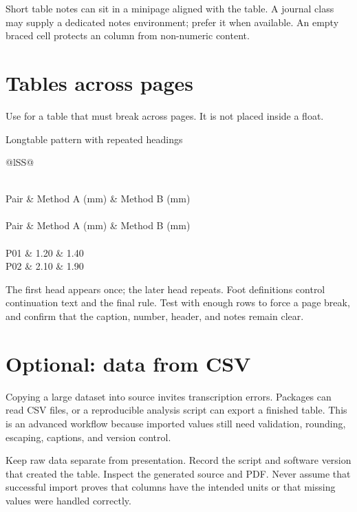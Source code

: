 Short table notes can sit in a minipage aligned with the table. A journal class
may supply a dedicated notes environment; prefer it when available. An empty
braced cell protects an  column from non-numeric content.

\section{Tables across pages}

Use  for a table that must break across pages. It is not placed
inside a  float.

\begin{latexcode}{Longtable pattern with repeated headings}
\begin{longtable}{@{}lSS@{}}
\caption{Complete simulated measurements.}\label{tab:all-pairs}\\
\toprule
{Pair} & {Method A (mm)} & {Method B (mm)} \\
\midrule
\endfirsthead
{}\\
\toprule
{Pair} & {Method A (mm)} & {Method B (mm)} \\
\midrule
\endhead
\midrule
{}\\
\endfoot
\bottomrule
\endlastfoot
P01 & 1.20 & 1.40 \\
P02 & 2.10 & 1.90 \\
\end{longtable}
\end{latexcode}

The first head appears once; the later head repeats. Foot definitions control
continuation text and the final rule. Test with enough rows to force a page
break, and confirm that the caption, number, header, and notes remain clear.

\section{Optional: data from CSV}

Copying a large dataset into source invites transcription errors. Packages can
read CSV files, or a reproducible analysis script can export a finished
 table. This is an advanced workflow because imported values still
need validation, rounding, escaping, captions, and version control.

\begin{advancedtopic}
Keep raw data separate from presentation. Record the script and software
version that created the table. Inspect the generated source and PDF. Never
assume that successful import proves that columns have the intended units or
that missing values were handled correctly.
\end{advancedtopic}


